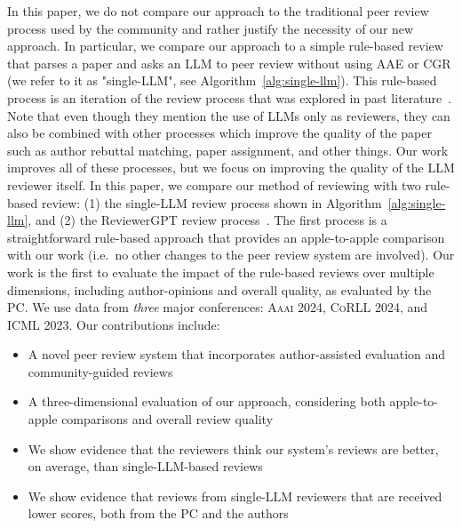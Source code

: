 In this paper, we do not compare our approach to the traditional peer review process used by the community and rather justify the necessity of our new approach. In particular, we compare our approach to a simple rule-based review that parses a paper and asks an LLM to peer review without using AAE or CGR (we refer to it as "single-LLM", see Algorithm~\ref{alg:single-llm}). This rule-based process is an iteration of the review process that was explored in past literature~\cite{liu2023reviewergpt}. Note that even though they mention the use of LLMs only as reviewers, they can also be combined with other processes which improve the quality of the paper such as author rebuttal matching, paper assignment, and other things. Our work improves all of these processes, but we focus on improving the quality of the LLM reviewer itself. 
In this paper, we compare our method of reviewing with two rule-based review: (1) the single-LLM review process shown in Algorithm~\ref{alg:single-llm}, and (2) the ReviewerGPT review process~\citep{liu2023reviewergpt}. The first process is a straightforward rule-based approach that provides an apple-to-apple comparison with our work (i.e.\ no other changes to the peer review system are involved). Our work is the first to evaluate the impact of the rule-based reviews over multiple dimensions, including author-opinions and overall quality, as evaluated by the PC. We use data from \textit{three} major conferences: \textsc{Aaai 2024}, \textsc{CoRLL 2024}, and \textsc{ICML 2023}.
Our contributions include:
\begin{itemize}
    \itemsep 0pt 
    \item A novel peer review system that incorporates author-assisted evaluation and community-guided reviews
    \item A three-dimensional evaluation of our approach, considering both apple-to-apple comparisons and overall review quality
    \item We show evidence that the reviewers think our system's reviews are better, on average, than single-LLM-based reviews
    \item We show evidence that reviews from single-LLM reviewers that are received lower scores, both from the PC and the authors
\end{itemize}

